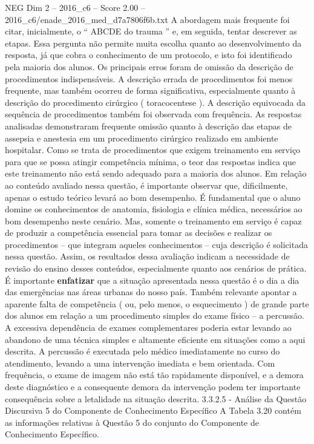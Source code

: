 \begin{textsample}{NEG Dim 2 – 2016\_c6 – Score 2.00 – 2016\_c6/enade\_2016\_med\_d7a7806f6b.txt}
A abordagem mais frequente foi citar, inicialmente, o “ ABCDE do trauma ” e, em seguida, tentar descrever as etapas.
Essa pergunta não permite muita escolha quanto ao desenvolvimento da resposta, já que cobra o conhecimento de um protocolo, e isto foi identificado pela maioria dos alunos.
Os principais erros foram de omissão da descrição de procedimentos indispensáveis.
A descrição errada de procedimentos foi menos frequente, mas também ocorreu de forma significativa, especialmente quanto à descrição do procedimento cirúrgico ( toracocentese ).
A descrição equivocada da sequência de procedimentos também foi observada com frequência.
As respostas analisadas demonstraram frequente omissão quanto à descrição das etapas de assepsia e anestesia em um procedimento cirúrgico realizado em ambiente hospitalar.
Como se trata de procedimentos que exigem treinamento em serviço para que se possa atingir competência mínima, o teor das respostas indica que este treinamento não está sendo adequado para a maioria dos alunos.
Em relação ao conteúdo avaliado nessa questão, é importante observar que, dificilmente, apenas o estudo teórico levará ao bom desempenho.
É fundamental que o aluno domine os conhecimentos de anatomia, fisiologia e clínica médica, necessários ao bom desempenho neste cenário.
Mas, somente o treinamento em serviço é capaz de produzir a competência essencial para tomar as decisões e realizar os procedimentos – que integram aqueles conhecimentos – cuja descrição é solicitada nessa questão.
Assim, os resultados dessa avaliação indicam a necessidade de revisão do ensino desses conteúdos, especialmente quanto aos cenários de prática.
É importante \textbf{enfatizar} que a situação apresentada nessa questão é o dia a dia das emergências nas áreas urbanas do nosso país.
Também relevante apontar a aparente falta de competência ( ou, pelo menos, o esquecimento ) de grande parte dos alunos em relação a um procedimento simples do exame físico – a percussão.
A excessiva dependência de exames complementares poderia estar levando ao abandono de uma técnica simples e altamente eficiente em situações como a aqui descrita.
A percussão é executada pelo médico imediatamente no curso do atendimento, levando a uma intervenção imediata e bem orientada.
Com frequência, o exame de imagem não está tão rapidamente disponível, e a demora deste diagnóstico e a consequente demora da intervenção podem ter importante consequência sobre a letalidade na situação descrita. 3.3.2.5 - Análise da Questão Discursiva 5 do Componente de Conhecimento Específico A Tabela 3.20 contém as informações relativas à Questão 5 do conjunto do Componente de Conhecimento Específico.

\end{textsample}
